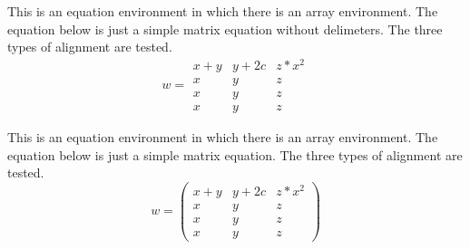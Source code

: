 \documentclass{article}
\begin{document}
This is an equation environment in which there is an array environment.  The equation below
is just a simple matrix equation without delimeters.  The three types of alignment are
tested.  
\begin{equation*}
w =  
\begin{array}{lcr}
x+y & y+2c & z * x^2 \\
x & y & z \\
x & y & z \\
x & y & z 
\end{array}
\end{equation*}

This is an equation environment in which there is an array environment.  The equation below
is just a simple matrix equation.  The three types of alignment are
tested.  
\begin{equation}
w = \left( 
\begin{array}{lcr}
x+y & y+2c & z * x^2 \\
x & y & z \\
x & y & z \\
x & y & z 
\end{array}
\right)
\end{equation}
\end{document}
